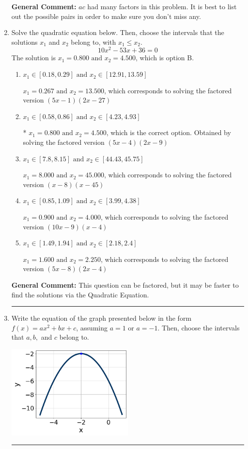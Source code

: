 \documentclass{extbook}[14pt]
\newcommand{\litem}[1]{\item #1

\rule{\textwidth}{0.4pt}}
\begin{document}
\begin{enumerate}
{\textbf{General Comment:} $ac$ had many factors in this problem. It is best to list out the possible pairs in order to make sure you don't miss any.
}
\litem{
Solve the quadratic equation below. Then, choose the intervals that the solutions $x_1$ and $x_2$ belong to, with $x_1 \leq x_2$.
\[ 10x^{2} -53 x + 36 = 0 \]The solution is \( x_1 = 0.800 \text{ and } x_2 = 4.500 \), which is option B.\begin{enumerate}[label=\Alph*.]
\item \( x_1 \in [0.18, 0.29] \text{ and } x_2 \in [12.91, 13.59] \)

$x_1 = 0.267 \text{ and } x_2 = 13.500$, which corresponds to solving the factored version $(5x -1)(2x -27)$
\item \( x_1 \in [0.58, 0.86] \text{ and } x_2 \in [4.23, 4.93] \)

* $x_1 = 0.800 \text{ and } x_2 = 4.500$, which is the correct option. Obtained by solving the factored version $(5x -4)(2x -9)$
\item \( x_1 \in [7.8, 8.15] \text{ and } x_2 \in [44.43, 45.75] \)

$x_1 = 8.000 \text{ and } x_2 = 45.000$, which corresponds to solving the factored version $(x -8)(x -45)$
\item \( x_1 \in [0.85, 1.09] \text{ and } x_2 \in [3.99, 4.38] \)

$x_1 = 0.900 \text{ and } x_2 = 4.000$, which corresponds to solving the factored version $(10x -9)(x -4)$
\item \( x_1 \in [1.49, 1.94] \text{ and } x_2 \in [2.18, 2.4] \)

$x_1 = 1.600 \text{ and } x_2 = 2.250$, which corresponds to solving the factored version $(5x -8)(2x -4)$
\end{enumerate}

\textbf{General Comment:} This question can be factored, but it may be faster to find the solutions via the Quadratic Equation.
}
\litem{
Write the equation of the graph presented below in the form $f(x)=ax^2+bx+c$, assuming  $a=1$ or $a=-1$. Then, choose the intervals that $a, b,$ and $c$ belong to.

\begin{center}
    \includegraphics[width=0.5\textwidth]{../Figures/quadraticGraphToEquationCopyA.png}
\end{center}


}
\end{enumerate}
\end{document}
